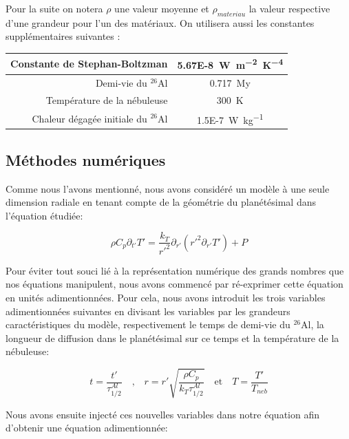 \documentclass[10pt,a4paper]{article}
\numberwithin{equation}{section}
\begin{document}
Pour la suite on notera $\rho$ une valeur moyenne et $\rho_{materiau}$ la valeur respective d'une grandeur pour l'un des matériaux.
On utilisera aussi les constantes supplémentaires suivantes :

\begin{center}
  \begin{tabu}{ r  c }
    \hline
    Constante de Stephan-Boltzman & \SI{5.67E-8}{W.m^{-2}.K^{-4}}  \\ \hline
    Demi-vie du $^{26}$Al & \SI{0.717}{My}  \\ \hline
    Température de la nébuleuse & \SI{300}{K}  \\ \hline
    Chaleur dégagée initiale du $^{26}$Al & \SI{1.5E-7}{W.kg^{-1}}  \\ \hline
  \end{tabu}
\end{center}


\subsection{Méthodes numériques}

Comme nous l'avons mentionné, nous avons considéré un modèle à une seule dimension radiale en tenant compte de la géométrie du planétésimal dans l'équation étudiée:

\begin{equation}
\rho C_p \partial_{t'} T' = \frac{k_{T} }{r'^2} \partial_{r'} ( {r'}^2 \partial_{r'} T')  + P
\end{equation}



Pour éviter tout souci lié à la représentation numérique des grands nombres que nos équations manipulent, nous avons commencé par ré-exprimer cette équation en unités adimentionnées. Pour cela, nous avons introduit les trois variables adimentionnées suivantes en divisant les variables par les grandeurs caractéristiques du modèle, respectivement le temps de demi-vie du $^{26}$Al, la longueur de diffusion dans le planétésimal sur ce temps et la température de la nébuleuse: 


\begin{equation}
t= \frac{t'}{\tau^{Al}_{1/2}}  \quad \textrm{,} \quad   r = r' \sqrt{\frac{\rho C_p} {k_T \tau^{Al}_{1/2}}} \quad  \textrm{et} \quad T = \frac{T'}{T_{neb}} 
\end{equation}

Nous avons ensuite injecté ces nouvelles variables dans notre équation afin d'obtenir une équation adimentionnée:
\end{document}
